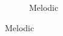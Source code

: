 \documentclass{article} %
\begin{document}
\begin{figure}
\begin{preview}
\begin{subfigure}[b]{.3\linewidth}
	\vspace*{-1.8em}
        \caption*{\sffamily Melodic}
      \end{subfigure}
\end{preview}
\end{figure}
\end{document}
